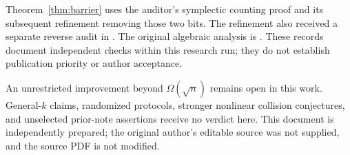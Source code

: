 \documentclass[11pt]{article}
\theoremstyle{remark}
\begin{document}
Theorem~\ref{thm:barrier} uses the auditor's symplectic counting proof
and its subsequent refinement removing those two bits. The refinement
also received a separate reverse audit in
.
The original algebraic analysis is
.
These records document independent checks within this research run;
they do not establish publication priority or author acceptance.

An unrestricted improvement beyond $\Omega(\sqrt n)$ remains open in
this work. General-$k$ claims, randomized protocols, stronger nonlinear
collision conjectures, and unselected prior-note assertions receive no
verdict here. This document is independently prepared; the original
author's editable source was not supplied, and the source PDF is not
modified.
\end{document}
